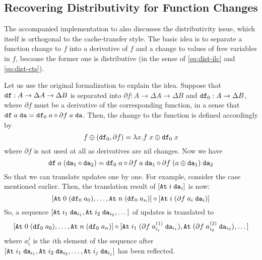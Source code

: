 \documentclass{article}
\theoremstyle{definition}
\begin{document}




\subsection{Recovering Distributivity for Function Changes}
\label{sec:distributivity-and-function-changes}

The accompanied implementation to \citet{GiarrussoRS19} also discusses 
the distributivity issue, which itself is orthogonal to the cache-transfer style.
The basic idea is to separate a function change to $f$ into a derivative of $f$ and a change to values of free variables in $f$, because 
the former one is distributive (in the sense of \ref{eq:dist-ilc} and \ref{eq:dist-cts}). 

Let us use the original formalization to explain the idea. 
Suppose that $\texttt{df} : A \to \Delta A \to \Delta B$ is separated into $\partial f : A \to \Delta A \to \Delta B$ and $\texttt{df}_0 : A \to \Delta B$, where 
$\partial f$ must be a derivative of the corresponding function, in a sense that $\texttt{df} \; a \; \texttt{da} = \texttt{df}_0 \; a \mathbin{\diamond} \partial f \; a \; \texttt{da}$.
Then, the change to the function is defined accordingly by 
\[
 f \oplus (\texttt{df}_0, \partial f) = \lambda x. f \; x \oplus \texttt{df}_0 \; x
\]
where $\partial f$ is not used at all as derivatives are nil changes. Now we have 
\[
 \texttt{df} \; a \; (\texttt{da}_1 \mathbin{\diamond} \texttt{da}_2) = \texttt{df}_0 \; a \mathbin{\diamond} \partial f \; a \; \texttt{da}_1 \mathbin{\diamond} \partial f \; (a \oplus \texttt{da}_1) \; \texttt{da}_2 
\]
So that we can translate updates one by one. For example, consider the  case mentioned earlier. 
Then, the translation result of $[\texttt{At} \; i \; \texttt{da}_i]$ is now:
\[
[ \texttt{At} \; 0 \; (\texttt{df}_0 \; a_0), \dots, \texttt{At} \; n \; (\texttt{df}_0 \; a_n) ] \mathbin{\diamond} [\texttt{At} \; i \; (\partial f \; a_i \; \texttt{da}_i)]
\]
So, a sequence $[\texttt{At} \; {i_1} \; \texttt{da}_{i_1}, \texttt{At} \; {i_2} \; \texttt{da}_{i_2},\dots]$ of updates is translated to 
\[
[ \texttt{At} \; 0 \; (\texttt{df}_0 \; a_0), \dots, \texttt{At} \; n \; (\texttt{df}_0 \; a_n) ] \mathbin{\diamond} [\texttt{At} \; i_1 \; (\partial f \; a^{(1)}_{i_i} \; \texttt{da}_{i_1}), \texttt{At} \; (\partial f \; a^{(2)}_{i_2} \; \texttt{da}_{i_2}), \dots]
\]
where $a^j_i$ is the $i$th element of the sequence after $[\texttt{At} \; {i_1} \; \texttt{da}_{i_1}, \texttt{At} \; {i_2} \; \texttt{da}_{i_2},\dots, \texttt{At} \; {i_j} \; \texttt{da}_{i_j}]$ has been reflected. 
\end{document}
